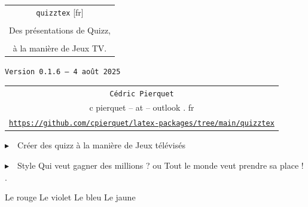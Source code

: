 \documentclass[french,a4paper,11pt]{article}
\def\TPversion{0.1.6}
\def\TPdate{4 août 2025}
\begin{document}
\setlength{\aweboxleftmargin}{0.07\linewidth}
\setlength{\aweboxcontentwidth}{0.93\linewidth}
\setlength{\aweboxvskip}{8pt}

\pagestyle{fancy}

\thispagestyle{empty}

\vspace{2cm}

\begin{center}
	\begin{minipage}{0.75\linewidth}
	\begin{tcolorbox}[colframe=yellow,colback=yellow!15]
		\begin{center}
			\begin{tabular}{c}
				{\Huge \texttt{quizztex} [fr]}\\
				\\
				{\LARGE Des présentations de Quizz,} \\
				\\
				{\LARGE à la manière de Jeux TV.} \\
			\end{tabular}
			
			\bigskip
			
			{\small \texttt{Version \TPversion{} -- \TPdate}}
		\end{center}
	\end{tcolorbox}
\end{minipage}
\end{center}

\begin{center}
	\begin{tabular}{c}
	\texttt{Cédric Pierquet}\\
	{\ttfamily c pierquet -- at -- outlook . fr}\\
	\texttt{\url{https://github.com/cpierquet/latex-packages/tree/main/quizztex}}
\end{tabular}
\end{center}

\vspace{0.25cm}

{$\blacktriangleright$~~Créer des quizz à la manière de Jeux télévisés}

\vspace{0.25cm}

{$\blacktriangleright$~~Style \og Qui veut gagner des millions ? \fg{} ou \og Tout le monde veut prendre sa place ! \fg{}.}

\vspace{1cm}

\hfill{}
{Le rouge} {Le violet}
{Le bleu} {Le jaune}\hfill~
\end{document}
